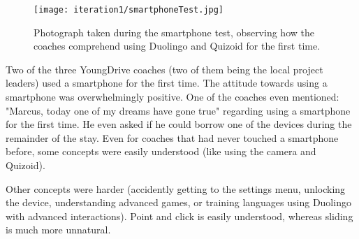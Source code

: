     \begin{figure}[h]
        \centering
        \texttt{[image: iteration1/smartphoneTest.jpg]}
        \caption{Photograph taken during the smartphone test, observing how the coaches comprehend using Duolingo and Quizoid for the first time.}
        \label{fig:smartphoneTest}
    \end{figure}

    \clearpage

    Two of the three YoungDrive coaches (two of them being the local project leaders) used a smartphone for the first time. The attitude towards using a smartphone was overwhelmingly positive. One of the coaches even mentioned: "Marcus, today one of my dreams have gone true" regarding using a smartphone for the first time. He even asked if he could borrow one of the devices during the remainder of the stay. Even for coaches that had never touched a smartphone before, some concepts were easily understood (like using the camera and Quizoid).

    Other concepts were harder (accidently getting to the settings menu, unlocking the device, understanding advanced games, or training languages using Duolingo with advanced interactions). Point and click is easily understood, whereas sliding is much more unnatural.
